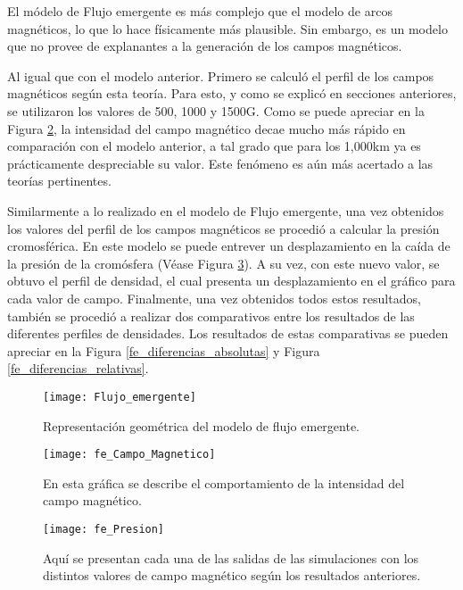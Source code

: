El m\'odelo de Flujo emergente es m\'as complejo que el modelo de arcos magn\'eticos, lo que lo hace f\'isicamente m\'as plausible. Sin embargo, es un modelo que no provee de explanantes a la generaci\'on de los campos magn\'eticos.

Al igual que con el modelo anterior. Primero se calcul\'o el perfil de los campos magn\'eticos seg\'un esta teor\'ia. Para esto, y como se explic\'o en secciones anteriores, se utilizaron los valores de 500, 1000 y 1500G. Como se puede apreciar en la Figura \ref{fe_Campo_Magnetico}, la intensidad del campo magn\'etico decae mucho m\'as r\'apido en comparaci\'on con el modelo anterior, a tal grado que para los 1,000km ya es pr\'acticamente despreciable su valor. Este fen\'omeno es a\'un m\'as acertado a las teor\'ias pertinentes.

Similarmente a lo realizado en el modelo de Flujo emergente, una vez obtenidos los valores del perfil de los campos magn\'eticos se procedi\'o a calcular la presi\'on cromosf\'erica. En este modelo se puede entrever un desplazamiento en la ca\'ida de la presi\'on de la crom\'osfera (V\'ease Figura \ref{fe_Presion}). A su vez, con este nuevo valor, se obtuvo el perfil de densidad, el cual presenta un desplazamiento en el gr\'afico para cada valor de campo. 
Finalmente, una vez obtenidos todos estos resultados, tambi\'en se procedi\'o a realizar dos comparativos entre los resultados de las diferentes perfiles de densidades. Los resultados de estas comparativas se pueden apreciar en la Figura \ref{fe_diferencias_absolutas} y Figura \ref{fe_diferencias_relativas}.

\begin{figure}[h]
\centering
\texttt{[image: Flujo\_emergente]}
\caption{ Representaci\'on geom\'etrica del modelo de flujo emergente. }
\label{Flujo_emergente}
\end{figure}

\begin{figure}[h]
\centering
\texttt{[image: fe\_Campo\_Magnetico]}
\caption{ En esta gr\'afica se describe el comportamiento de la intensidad del campo magn\'etico. }
\label{fe_Campo_Magnetico}
\end{figure}

\begin{figure}[h]
\centering
\texttt{[image: fe\_Presion]}
\caption{ Aqu\'i se presentan cada una de las salidas de las simulaciones con los distintos valores de campo magn\'etico seg\'un los resultados anteriores.}
\label{fe_Presion}
\end{figure}

